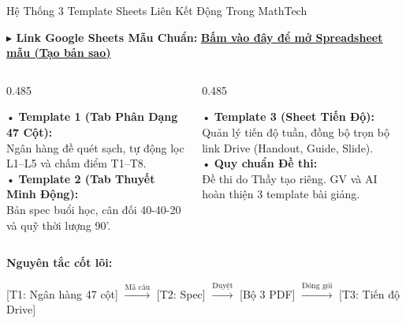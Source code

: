 \documentclass[aspectratio=169,11pt]{beamer}
\begin{document}
\begin{frame}{Hệ Thống 3 Template Sheets Liên Kết Động Trong MathTech}
  \vspace{-5pt}
  \begin{center}
    \scriptsize\colorbox{brand!10}{%
      \textbf{$\blacktriangleright$ Link Google Sheets Mẫu Chuẩn:}
      \href{https://docs.google.com/spreadsheets/d/1ARD_4AKM_aXlyGz3tOCoUYjOEnlOgXCmcO0ISeK6boY/edit}{\textbf{\color{info}Bấm vào đây để mở Spreadsheet mẫu (Tạo bản sao)}}%
    }
  \end{center}
  \vspace{1pt}
  \begin{columns}[T]
    \begin{column}{0.485\textwidth}
      \begin{tcolorbox}[slidecard, top=2pt, bottom=2pt, title=Template 1 \& 2: Thiết Kế \& Phân Dạng]
        \scriptsize
        • \textbf{Template 1 (Tab Phân Dạng 47 Cột):}\\
        Ngân hàng đề quét sạch, tự động lọc L1–L5 và chấm điểm T1–T8.\\[2pt]
        • \textbf{Template 2 (Tab Thuyết Minh Động):}\\
        Bản spec buổi học, cân đối 40-40-20 và quỹ thời lượng 90'.
      \end{tcolorbox}
    \end{column}

    \begin{column}{0.485\textwidth}
      \begin{tcolorbox}[successcard, top=2pt, bottom=2pt, title=Template 3: Bàn Giao \& Tiến Độ]
        \scriptsize
        • \textbf{Template 3 (Sheet Tiến Độ):}\\
        Quản lý tiến độ tuần, đồng bộ trọn bộ link Drive (Handout, Guide, Slide).\\[2pt]
        • \textbf{Quy chuẩn Đề thi:}\\
        {\color{muted}Đề thi do Thầy tạo riêng. GV và AI hoàn thiện 3 template bài giảng.}
      \end{tcolorbox}
    \end{column}
  \end{columns}
  \vspace{1pt}
  \begin{tcolorbox}[accentcard, top=2pt, bottom=2pt]
    \centering\scriptsize
    \textbf{Nguyên tắc cốt lõi:}\par\vspace{1pt}
    [T1: Ngân hàng 47 cột] $\xrightarrow{\text{Mã câu}}$ [T2: Spec] $\xrightarrow{\text{Duyệt}}$ [Bộ 3 PDF] $\xrightarrow{\text{Đóng gói}}$ [T3: Tiến độ Drive]
  \end{tcolorbox}
\end{frame}
\end{document}
